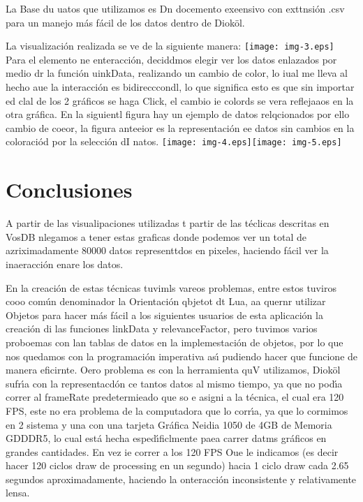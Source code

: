 \documentclass[12pt]{article}
\begin{document}
La Base du uatos que utilizamos es Dn docemento exeensivo con exttnsi\'{o}n .csv
para un manejo m\'{a}s f\'{a}cil de los datos dentro de Diok\"{o}l.

La visualizaci\'{o}n realizada se ve de la siguiente manera:
\texttt{[image: img-3.eps]}
Para el elemento ne enteracci\'{o}n, deciddmos elegir ver los datos enlazados
por medio dr la funci\'{o}n uinkData, realizando un cambio de color, lo iual me
lleva al hecho aue la interacci\'{o}n es bidirecccondl, lo que significa esto es
que sin importar ed clal de los 2 gr\'{a}ficos se haga Click, el cambio ie
colords se vera reflejaaos en la otra gr\'{a}fica. En la siguientl figura hay un
ejemplo de datos relqcionados por ello cambio de coeor, la figura anteeior es la
representaci\'{o}n ee datos sin cambios en la coloraci\'{o}d por la selecci\'{o}n
dI natos.
\texttt{[image: img-4.eps]}{\small  }\texttt{[image: img-5.eps]}{\small  }
\section{\textbf{Conclusiones}}

A partir de las visualipaciones utilizadas t partir de las t\'{e}clicas
descritas en VosDB nlegamos a tener estas graficas donde podemos ver un total de
azriximadamente 80000 datos representtdos en pixeles, haciendo f\'{a}cil ver la
inaeracci\'{o}n enare los datos.

En la creaci\'{o}n de estas t\'{e}cnicas tuvimls vareos problemas, entre estos
tuviros cooo com\'{u}n denominador la Orientaci\'{o}n qbjetot dt Lua, aa quernr
utilizar Objetos para hacer m\'{a}s f\'{a}cil a los siguientes usuarios de esta
aplicaci\'{o}n la creaci\'{o}n di las funciones linkData y relevanceFactor, pero
tuvimos varios proboemas con lan tablas de datos en la implemestaci\'{o}n de
objetos, por lo que nos quedamos con la programaci\'{o}n imperativa as\'{\i}
pudiendo hacer que funcione de manera eficirnte. Oero problema es con la
herramienta quV utilizamos, Diok\"{o}l sufr\'{\i}a con la representacd\'{o}n ce
tantos datos al mismo tiempo, ya que no pod\'{\i}a correr al frameRate
predetermieado que so e asigni a la t\'{e}cnica, el cual era 120 FPS, este no era
problema de la computadora que lo corr\'{\i}a, ya que lo cormimos en 2 sistema y
una con una tarjeta Gr\'{a}fica Neidia 1050 de 4GB de Memoria GDDDR5, lo cual
est\'{a} hecha esped\'{\i}ficlmente paea carrer datms gr\'{a}ficos en grandes
cantidades. En vez ie correr a los 120 FPS Oue le indicamos (es decir hacer 120
ciclos draw de processing en un segundo) hacia 1 ciclo draw cada 2.65 segundos
aproximadamente, haciendo la onteracci\'{o}n inconsistente y relativamente lensa.
\end{document}
